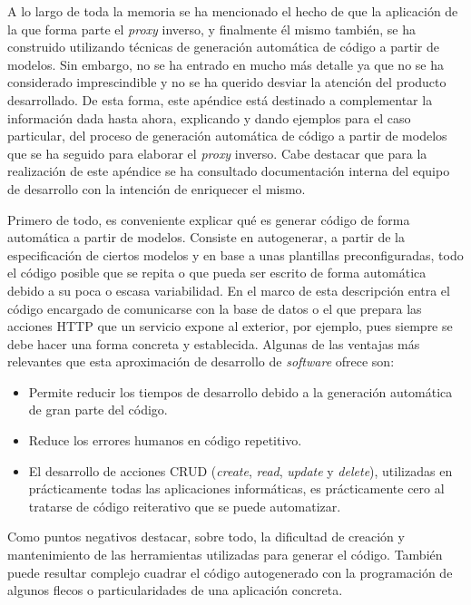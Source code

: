 \documentclass[11pt,spanish,listoffigures]{tfgetsinf}
\begin{document}
A lo largo de toda la memoria se ha mencionado el hecho de que la aplicación de la que forma parte el \emph{proxy} inverso, y finalmente él mismo también, se ha construido utilizando técnicas de generación automática de código a partir de modelos. Sin embargo, no se ha entrado en mucho más detalle ya que no se ha considerado imprescindible y no se ha querido desviar la atención del producto desarrollado. De esta forma, este apéndice está destinado a complementar la información dada hasta ahora, explicando y dando ejemplos para el caso particular, del proceso de generación automática de código a partir de modelos que se ha seguido para elaborar el \emph{proxy} inverso. Cabe destacar que para la realización de este apéndice se ha consultado documentación interna del equipo de desarrollo con la intención de enriquecer el mismo.

Primero de todo, es conveniente explicar qué es generar código de forma automática a partir de modelos. Consiste en autogenerar, a partir de la especificación de ciertos modelos y en base a unas plantillas preconfiguradas, todo el código posible que se repita o que pueda ser escrito de forma automática debido a su poca o escasa variabilidad. En el marco de esta descripción entra el código encargado de comunicarse con la base de datos o el que prepara las acciones HTTP que un servicio expone al exterior, por ejemplo, pues siempre se debe hacer una forma concreta y establecida. Algunas de las ventajas más relevantes que esta aproximación de desarrollo de \emph{software} ofrece son:

\begin{itemize}

	\item Permite reducir los tiempos de desarrollo debido a la generación automática de gran parte del código.

	\item Reduce los errores humanos en código repetitivo.

	\item El desarrollo de acciones CRUD (\emph{create}, \emph{read}, \emph{update} y \emph{delete}), utilizadas en prácticamente todas las aplicaciones informáticas, es prácticamente cero al tratarse de código reiterativo que se puede automatizar.

\end{itemize}

Como puntos negativos destacar, sobre todo, la dificultad de creación y mantenimiento de las herramientas utilizadas para generar el código. También puede resultar complejo cuadrar el código autogenerado con la programación de algunos flecos o particularidades de una aplicación concreta.
\end{document}
